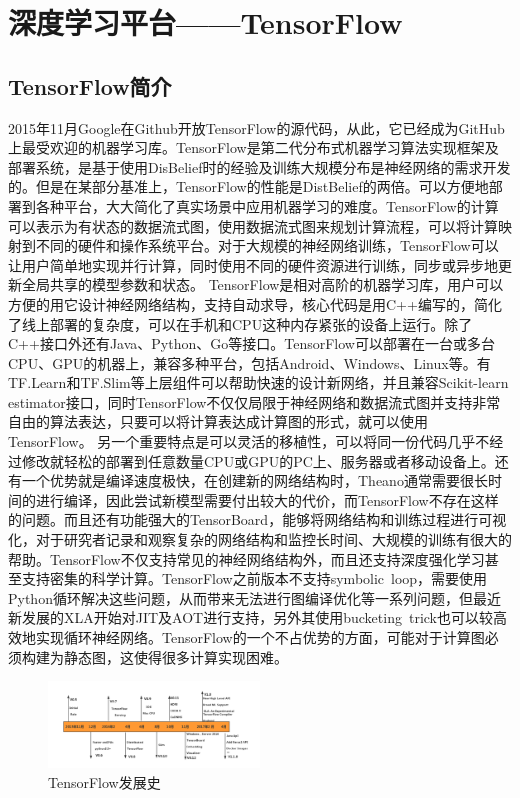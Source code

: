 \chapter{深度学习平台——TensorFlow}
	\section{TensorFlow简介}
	2015年11月Google在Github开放TensorFlow的源代码，从此，它已经成为GitHub上最受欢迎的机器学习库。TensorFlow是第二代分布式机器学习算法实现框架及部署系统，是基于使用DisBelief时的经验及训练大规模分布是神经网络的需求开发的。但是在某部分基准上，TensorFlow的性能是DistBelief的两倍。可以方便地部署到各种平台，大大简化了真实场景中应用机器学习的难度。TensorFlow的计算可以表示为有状态的数据流式图，使用数据流式图来规划计算流程，可以将计算映射到不同的硬件和操作系统平台。对于大规模的神经网络训练，TensorFlow可以让用户简单地实现并行计算，同时使用不同的硬件资源进行训练，同步或异步地更新全局共享的模型参数和状态。
	TensorFlow是相对高阶的机器学习库，用户可以方便的用它设计神经网络结构，支持自动求导，核心代码是用C++编写的，简化了线上部署的复杂度，可以在手机和CPU这种内存紧张的设备上运行。除了C++接口外还有Java、Python、Go等接口。TensorFlow可以部署在一台或多台CPU、GPU的机器上，兼容多种平台，包括Android、Windows、Linux等。有TF.Learn和TF.Slim等上层组件可以帮助快速的设计新网络，并且兼容Scikit-learn estimator接口，同时TensorFlow不仅仅局限于神经网络和数据流式图并支持非常自由的算法表达，只要可以将计算表达成计算图的形式，就可以使用TensorFlow。
	另一个重要特点是可以灵活的移植性，可以将同一份代码几乎不经过修改就轻松的部署到任意数量CPU或GPU的PC上、服务器或者移动设备上。还有一个优势就是编译速度极快，在创建新的网络结构时，Theano通常需要很长时间的进行编译，因此尝试新模型需要付出较大的代价，而TensorFlow不存在这样的问题。而且还有功能强大的TensorBoard，能够将网络结构和训练过程进行可视化，对于研究者记录和观察复杂的网络结构和监控长时间、大规模的训练有很大的帮助。TensorFlow不仅支持常见的神经网络结构外，而且还支持深度强化学习甚至支持密集的科学计算。TensorFlow之前版本不支持symbolic loop，需要使用Python循环解决这些问题，从而带来无法进行图编译优化等一系列问题，但最近新发展的XLA开始对JIT及AOT进行支持，另外其使用bucketing trick也可以较高效地实现循环神经网络。TensorFlow的一个不占优势的方面，可能对于计算图必须构建为静态图，这使得很多计算实现困难。
	\begin{figure}[!ht]
		\centering
		\includegraphics[width=0.5\textwidth]{figures/2-1}
		\caption{TensorFlow发展史}
	\end{figure}
